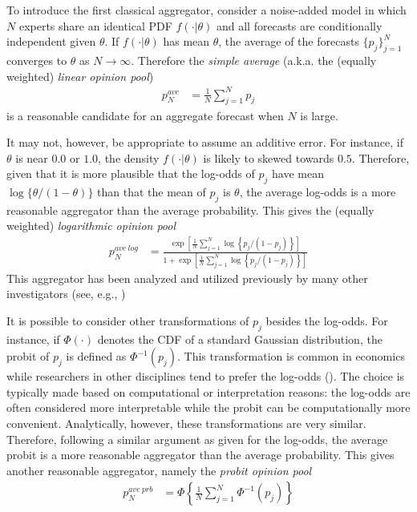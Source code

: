 \documentclass[11pt]{article}
\theoremstyle{definition}
\theoremstyle{definition}
\begin{document}
To introduce the first classical aggregator, consider a noise-added model in which $N$ experts share an identical PDF $f(\cdot | \theta)$ and all forecasts are conditionally independent given $\theta$. If $f(\cdot | \theta)$ has mean $\theta$, the average of the forecasts $\{ p_j \}_{j=1}^N$ converges to $\theta$ as $N \to \infty$. Therefore the \textit{simple average} (a.k.a. the (equally weighted) \textit{linear opinion pool})
\begin{align*}
p_N^{ave} &= \frac{1}{N} \sum_{j=1}^N p_j
\end{align*}
is a reasonable candidate for an aggregate forecast when $N$ is large.

It may not, however, be appropriate to assume an additive error. For instance, if $\theta$ is near $0.0$ or $1.0$,  the density $f(\cdot | \theta)$ is likely to skewed towards $0.5$.  Therefore, given that it is more plausible that the log-odds of $p_j$ have mean $\log\{\theta/(1-\theta)\}$ than that the mean of $p_j$ is $\theta$, the average  log-odds is a more reasonable aggregator than the average probability. This gives the (equally weighted) \textit{logarithmic opinion pool}
\begin{align*}
p_N^{ave\ log} &= \frac{\exp\left[ \frac{1}{N} \sum_{j=1}^N \log\left\{p_j / (1-p_j)\right\} \right]}{1+\exp\left[ \frac{1}{N} \sum_{j=1}^N \log\left\{p_j / (1-p_j)\right\} \right]}
\end{align*}
This aggregator has been analyzed and utilized previously by many other investigators (see, e.g., \cite{dawid1995coherent, Genest, bacharach1975group})

It is possible to consider other transformations of $p_j$ besides the log-odds. For instance,  if $\Phi(\cdot)$ denotes the CDF of a standard Gaussian distribution, the probit of $p_j$ is defined as $\Phi^{-1}(p_j)$. This transformation is common in economics while researchers in other disciplines tend to prefer the log-odds (\cite{bryan2013regression}). The choice is typically made based on computational or interpretation reasons: the log-odds are often considered more interpretable while the probit can be computationally more convenient. Analytically, however, these transformations are very similar. Therefore, following a similar argument as given for the log-odds, the average probit is a more reasonable aggregator than the average probability. This gives another reasonable aggregator, namely the \textit{probit opinion pool}
\begin{align*}
p_N^{ave\ prb} &= \Phi \left\{ \frac{1}{N} \sum_{j=1}^N \Phi^{-1}(p_j) \right\}
\end{align*}
\end{document}
